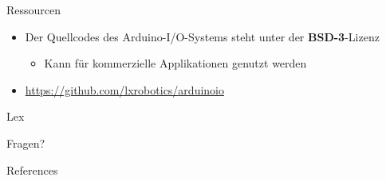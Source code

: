 \documentclass{beamer}
\begin{document}
\begin{frame}{Ressourcen}
	\begin{itemize}
		\item Der Quellcodes des Arduino-I/O-Systems steht unter der \textbf{BSD-3}-Lizenz
		\begin{itemize}
			\item Kann f\"ur kommerzielle Applikationen genutzt werden
		\end{itemize}
	\end{itemize}
	\begin{itemize}
		\item \url{https://github.com/lxrobotics/arduinoio}
	\end{itemize}
\end{frame}
\begin{frame}{Lex}
	
\end{frame}
\begin{frame}
	\Huge{\centerline{Fragen?}}
\end{frame}
\begin{frame}[allowframebreaks]{References}
\end{frame}
\end{document}
